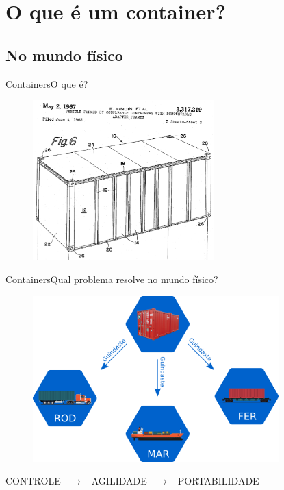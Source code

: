 \section{O que é um container?}
\subsection{No mundo físico}
\begin{frame}{Containers}{O que é?}
  \begin{figure}[ht!]
    \centering
    \includegraphics[width=70mm]{images/container_patent.png}
  \end{figure}
\end{frame}

\begin{frame}{Containers}{Qual problema resolve no mundo físico?}
  \begin{figure}[ht!]
    \centering
    \includegraphics[width=95mm]{images/container_intermodal.png}
  \end{figure}
  \begin{center}
    CONTROLE ~$\to$~ AGILIDADE ~$\to$~ PORTABILIDADE
  \end{center}
\end{frame}

